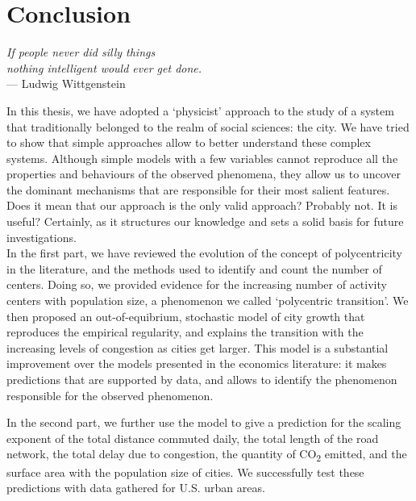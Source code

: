 %
\chapter{Conclusion}
\label{sec:conclusion}

\begin{flushright}{\slshape    
If people never did silly things\\
nothing intelligent would ever get done.} \\ \medskip
--- Ludwig Wittgenstein~\cite{Luckhardt:1979}
\end{flushright}

\bigskip

In this thesis, we have adopted a `physicist' approach to the study of a system
that traditionally belonged to the realm of social sciences: the city. We have
tried to show that simple approaches allow to better understand
these complex systems. Although simple models with a few variables cannot
reproduce all the properties and behaviours of the observed phenomena, they
allow us to uncover the dominant mechanisms that are responsible for their most
salient features. Does it mean that our approach is the only valid approach?
Probably not. It is useful? Certainly, as it structures
our knowledge and sets a solid basis for future investigations.\\

In the first part, we have reviewed the evolution of the concept of
polycentricity in the literature, and the methods used to identify and count the
number of centers. Doing so, we provided evidence for the increasing number of
activity centers with population size, a phenomenon we called `polycentric
transition'. We then proposed an out-of-equibrium, stochastic model of
city growth that reproduces the empirical regularity, and explains the
transition with the increasing levels of congestion as cities get larger. This
model is a substantial improvement over the models presented in the economics
literature: it makes predictions that are supported by data, and allows to
identify the phenomenon responsible for the observed phenomenon. 

In the second part, we further use the model to give a prediction for the
scaling exponent of the total distance commuted daily, the total length of the
road network, the total delay due to congestion, the quantity of
CO\textsubscript{2} emitted, and the surface area with the population size of
cities. We successfully test these predictions with data gathered for U.S. urban
areas.

